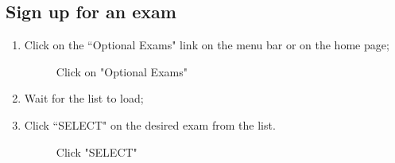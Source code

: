 \documentclass[ManualeUtente]{subfiles}
\begin{document}
\newpage
\subsection{Sign up for an exam}
\begin{enumerate}
	\item Click on the \textquotedblleft Optional Exams" link on the menu bar or on the home page;
	\begin{figure}[H]
		\centering
		\caption{Click on "Optional Exams"}
		\label{fig:Click on "Optional Exams"}
	\end{figure}
	\item Wait for the list to load;
	\item Click \textquotedblleft SELECT" on the desired exam from the list.
	\begin{figure}[H]
	\centering
	\caption{Click "SELECT"}
	\label{fig:Click "SELECT"}
	\end{figure}
\end{enumerate}
\end{document}
